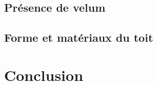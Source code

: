 		\section{Présence de velum}
		\section{Forme et matériaux du toit}
		
		\newpage
		
	\chapter*{Conclusion}
	
		\newpage
		
 
 

